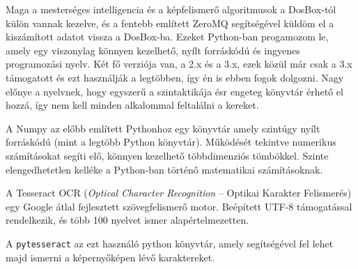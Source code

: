 
Maga a mesterséges intelligencia és a képfelismerő algoritmusok a DosBox-tól külön vannak kezelve, és a fentebb említett ZeroMQ segítségével küldöm el a kiszámított adatot vissza a DosBox-ba. Ezeket Python-ban progamozom le, amely egy viszonylag könnyen kezelhető, nyílt forráskódú és ingyenes programozási nyelv. Két fő verziója van, a 2.x és a 3.x, ezek közül már csak a 3.x támogatott és ezt használják a legtöbben, így én is ebben fogok dolgozni. Nagy előnye a nyelvnek, hogy egyszerű a szintaktikája ésr engeteg könyvtár érhető el hozzá, így nem kell minden alkalommal feltalálni a kereket.


A Numpy \cite{numpy} az előbb említett Pythonhoz egy könyvtár amely szintúgy nyílt forráskódú (mint a legtöbb Python könyvtár). Működését tekintve numerikus számításokat segíti elő, könnyen kezelhető többdimenziós tömbökkel. Szinte elengedhetetlen kelléke a Python-ban történő matematikai számításoknak.


A Tesseract OCR \cite{tesseract} (\textit{Optical Character Recognition} -- Optikai Karakter Felismerés) egy Google átlal fejlesztett szövegfelismerő motor. Beépített UTF-8 támogatással rendelkezik, és több 100 nyelvet ismer alapértelmezetten.

A \texttt{pytesseract} az ezt használó python könyvtár, amely segítségével fel lehet majd ismerni a képernyőképen lévő karaktereket.





